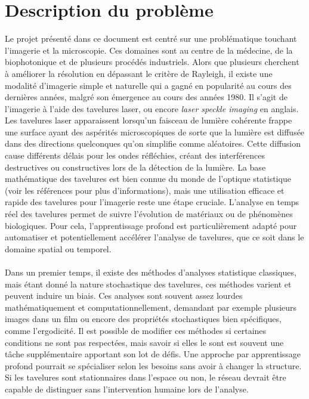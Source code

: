 \documentclass[MSc,french]{ulthese}
\begin{document}
\frontmatter %

\frontispice %
\newpage
\tableofcontents 
\newpage
\mainmatter 
\chapter{Description du problème}
Le projet présenté dans ce document est centré sur une problématique touchant l'imagerie et la microscopie. Ces domaines sont au centre de la médecine, de la biophotonique et de plusieurs procédés industriels. Alors que plusieurs cherchent à améliorer la résolution en dépassant le critère de Rayleigh, il existe une modalité d'imagerie simple et naturelle qui a gagné en popularité au cours des dernières années, malgré son émergence au cours des années 1980. Il s'agit de l'imagerie à l'aide des tavelures laser, ou encore \textit{laser speckle imaging} en anglais. Les tavelures laser apparaissent lorsqu'un faisceau de lumière cohérente frappe une surface ayant des aspérités microscopiques de sorte que la lumière est diffusée dans des directions quelconques qu'on simplifie comme aléatoires. Cette diffusion cause différents délais pour les ondes réfléchies, créant des interférences destructives ou constructives lors de la détection de la lumière. La base mathématique des tavelures est bien connue du monde de l'optique statistique (voir les références \cite{goodman_speckle_2020, goodman_statistical_2015, monMemoire} pour plus d'informations), mais une utilisation efficace et rapide des tavelures pour l'imagerie reste une étape cruciale. L’analyse en temps réel des tavelures permet de suivre l’évolution de matériaux ou de phénomènes biologiques. Pour cela, l’apprentissage profond est particulièrement adapté pour automatiser et potentiellement accélérer l'analyse de tavelures, que ce soit dans le domaine spatial ou temporel.
\\ \\
Dans un premier temps, il existe des méthodes d'analyses statistique classiques, mais étant donné la nature stochastique des tavelures, ces méthodes varient et peuvent induire un biais. Ces analyses sont souvent assez lourdes mathématiquement et computationnellement, demandant par exemple plusieurs images dans un film ou encore des propriétés stochastiques bien spécifiques, comme l'ergodicité. Il est possible de modifier ces méthodes si certaines conditions ne sont pas respectées, mais savoir si elles le sont est souvent une tâche supplémentaire apportant son lot de défis. Une approche par apprentissage profond pourrait se spécialiser selon les besoins sans avoir à changer la structure. Si les tavelures sont stationnaires dans l'espace ou non, le réseau devrait être capable de distinguer sans l'intervention humaine lors de l'analyse.
\end{document}

